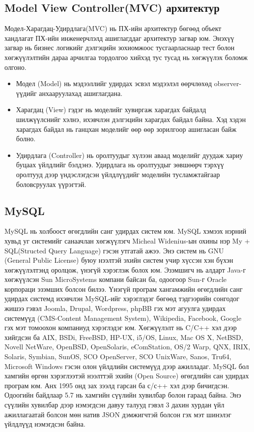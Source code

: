 \subsection{Model View Controller(MVC) архитектур}
\hspace{1cm}Модел-Харагдац-Удирдлага(MVC) нь ПХ-ийн архитектур бөгөөд объект хандлагат ПХ-ийн инженерчлэлд ашиглагддаг архитектур загвар юм. Энэхүү загвар нь бизнес логикийг дэлгэцийн зохиомжоос тусгаарласнаар тест болон хөгжүүлэлтийн дараа арчилгаа тордолгоо хийхэд тус тусад нь хөгжүүлэх боломж олгоно.
\begin{itemize}
	\item Модел (Model) нь мэдээллийг удирдах эсвэл мэдээлэл өөрчлөхөд observer-үүдийг анхааруулахад ашиглагдана.
	\item Харагдац (View) гэдэг нь моделийг хувиргаж харагдах байдалд шилжүүлснийг хэлнэ, ихэвчлэн дэлгэцийн харагдах байдал байна. Хэд хэдэн харагдах байдал нь ганцхан моделийг өөр өөр зорилгоор ашигласан байж болно.
	\item Удирдлага (Controller) нь оролтуудыг хүлээн аваад моделийг дуудаж хариу буцаах үйлдлийг бэлдэнэ. Удирдлага нь оролтуудыг зөвшөөрч тэрхүү оролтууд дээр үндэслэгдсэн үйлдлүүдийг моделийн тусламжтайгаар боловсруулах үүрэгтэй.
\end{itemize}
\subsection{MySQL}
\hspace{1cm}MySQL нь холбоост өгөгдлийн санг удирдах систем юм. MySQL хэмээх нэрний хувьд уг системийг санаачлан хөгжүүлэгч Micheal Widenius-ын охины нэр My + SQL(Structed Query Language) гэсэн утгатай ажээ.
Энэ систем нь GNU (General Public License) буюу нээлтэй эхийн систем учир хүссэн хэн бүхэн хөгжүүлэлтэнд оролцож, үнэгүй хэрэглэж болох юм. Эзэмшигч нь алдарт Java-г хөгжүүлсэн Sun MicroSystems компани байсан ба, одоогоор Sun-г Oracle корпораци эзэмших болсон билээ.
Үнэгүй програм хангамжийн өгөгдлийн санг удирдах системд ихэвчлэн MySQL-ийг хэрэглэдэг бөгөөд тэдгээрийн сонгодог жишээ гэвэл Joomla, Drupal, Wordpress, phpBB гэх мэт агуулга удирдах системүүд (CMS-Content Management System), Wikipedia, Facebook, Google гэх мэт томоохон компаниуд хэрэглэдэг юм.
Хөгжүүлэлт нь C/C++ хэл дээр хийгдсэн ба AIX, BSDi, FreeBSD, HP-UX, i5/OS, Linux, Mac OS X, NetBSD, Novell NetWare, OpenBSD, OpenSolaris, eComStation, OS/2 Warp, QNX, IRIX, Solaris, Symbian, SunOS, SCO OpenServer, SCO UnixWare, Sanos, Tru64, Microsoft Windows гэсэн олон үйлдлийн системүүд дээр ажилладаг.
MySQL бол хамгийн өргөн хэрэглээтэй нээлттэй эхийн (Open Source) өгөгдлийн сан удирдах програм юм. Анх 1995 онд зах зээлд гарсан ба с/с++ хэл дээр бичигдсэн. Одоогийн байдлаар 5.7 нь хамгийн сүүлийн хувилбар болон гараад байна. Энэ сүүлийн хувилбар дээр нэмэгдсэн давуу талууд гэвэл 3 дахин хурдан үйл ажиллагаатай болсон мөн натив JSON дэмжигчтэй болсон гэх мэт шинэлэг үйлдлүүд нэмэгдсэн байна.

